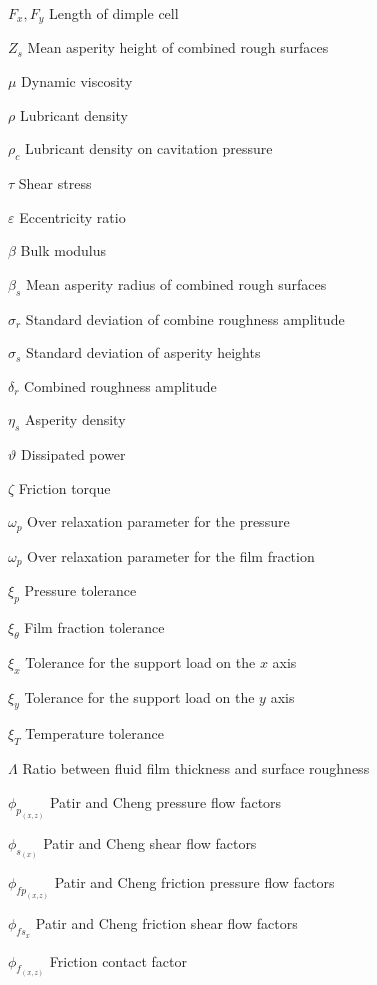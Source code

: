 \begin{simbolos}
	\item[$ F_x, F_y $] Length of dimple cell			
	\item[$ Z_s $] Mean asperity height of combined rough surfaces	
	\item[$ \mu $] Dynamic viscosity
	\item[$ \rho $] Lubricant density
	\item[$ \rho_c $] Lubricant density on cavitation pressure
	\item[$ \tau $] Shear stress
	\item[$ \varepsilon $] Eccentricity ratio
	\item[$ \beta $] Bulk modulus
	\item[$ \beta_s $] Mean asperity radius of combined rough surfaces
	\item[$ \sigma_r $] Standard deviation of combine roughness amplitude 
	\item[$ \sigma_s $] Standard deviation of asperity heights 
	\item[$ \delta_r $] Combined roughness amplitude
	\item[$ \eta_s $] Asperity density
	\item[$ \vartheta $] Dissipated power
	\item[$ \zeta $] Friction torque
	\item[$ \omega_p $] Over relaxation parameter for the pressure
	\item[$ \omega_p $] Over relaxation parameter for the film fraction
	\item[$ \xi_{p} $] Pressure tolerance
	\item[$ \xi_{\theta} $] Film fraction tolerance
	\item[$ \xi_{x} $] Tolerance for the support load on the $x$ axis
	\item[$ \xi_{y} $] Tolerance for the support load on the $y$ axis
	\item[$ \xi_{T} $] Temperature tolerance
	\item[$ \Lambda$] Ratio between fluid film thickness and surface roughness	
	\item[$ \phi_{p_{(x,z)}} $] Patir and Cheng pressure flow factors
	\item[$ \phi_{s_{(x)}} $] Patir and Cheng shear flow factors
	\item[$ \phi_{fp_{(x,z)}}$] Patir and Cheng friction pressure flow factors
	\item[$ \phi_{fs_{x}}$] Patir and Cheng friction shear flow factors
	\item[$ \phi_{f_{(x,z)}}$] Friction contact factor	
			
\end{simbolos}

